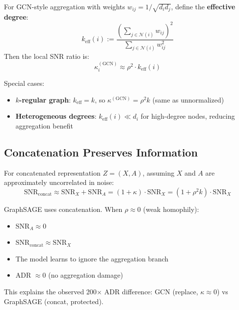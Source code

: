 \begin{theorem}
\label{thm:effective_degree}
For GCN-style aggregation with weights $w_{ij} = 1/\sqrt{d_i d_j}$, define the \textbf{effective degree}:
\begin{equation}
    k_{\mathrm{eff}}(i) := \frac{\left(\sum_{j \in \mathcal{N}(i)} w_{ij}\right)^2}{\sum_{j \in \mathcal{N}(i)} w_{ij}^2}
\end{equation}
Then the local SNR ratio is:
\begin{equation}
    \kappa_i^{\mathrm{(GCN)}} \approx \rho^2 \cdot k_{\mathrm{eff}}(i)
\end{equation}

Special cases:
\begin{itemize}
    \item \textbf{$k$-regular graph}: $k_{\mathrm{eff}} = k$, so $\kappa^{\mathrm{(GCN)}} = \rho^2 k$ (same as unnormalized)
    \item \textbf{Heterogeneous degrees}: $k_{\mathrm{eff}}(i) \ll d_i$ for high-degree nodes, reducing aggregation benefit
\end{itemize}
\end{theorem}

\subsection{Concatenation Preserves Information}
\label{subsec:concat}

\begin{theorem}
\label{thm:concat}
For concatenated representation $Z = (X, A)$, assuming $X$ and $A$ are approximately uncorrelated in noise:
\begin{equation}
    \mathrm{SNR}_{\mathrm{concat}} \approx \mathrm{SNR}_X + \mathrm{SNR}_A = (1 + \kappa) \cdot \mathrm{SNR}_X = (1 + \rho^2 k) \cdot \mathrm{SNR}_X
\end{equation}
\end{theorem}

\begin{corollary}
\label{cor:sage}
GraphSAGE uses concatenation. When $\rho \approx 0$ (weak homophily):
\begin{itemize}
    \item $\mathrm{SNR}_A \approx 0$
    \item $\mathrm{SNR}_{\mathrm{concat}} \approx \mathrm{SNR}_X$
    \item The model learns to ignore the aggregation branch
    \item ADR $\approx 0$ (no aggregation damage)
\end{itemize}
This explains the observed 200$\times$ ADR difference: GCN (replace, $\kappa \approx 0$) vs GraphSAGE (concat, protected).
\end{corollary}

